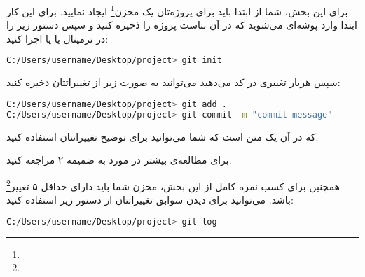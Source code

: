 برای این بخش، شما از ابتدا باید برای پروژه‌تان یک مخزن\footnote{}  ایجاد نمایید. برای این کار ابتدا وارد پوشه‌ای می‌شوید که در آن بناست پروژه را ذخیره کنید و سپس دستور زیر را در ترمینال یا  یا  اجرا کنید:

\begin{terminal}
    \begin{lstlisting}[language=bash]
C:/Users/username/Desktop/project> git init
    \end{lstlisting}
\end{terminal}

سپس هربار تغییری در کد می‌دهید می‌توانید به صورت زیر از تغییراتتان ذخیره کنید:

\begin{terminal}
    \begin{lstlisting}[language=bash]
C:/Users/username/Desktop/project> git add .
C:/Users/username/Desktop/project> git commit -m "commit message"
    \end{lstlisting}
\end{terminal}

که در آن  یک متن است که شما می‌توانید برای توضیح تغییراتتان استفاده کنید.

برای مطالعه‌ی بیشتر در مورد  به ضمیمه ۲ مراجعه کنید.

همچنین برای کسب نمره کامل از این بخش، مخزن  شما باید دارای حداقل ۵ تغییر\footnote{} باشد. می‌توانید برای دیدن سوابق تغییراتتان از دستور زیر استفاده کنید:

\begin{terminal}
    \begin{lstlisting}[language=bash]
C:/Users/username/Desktop/project> git log
    \end{lstlisting}
\end{terminal}
